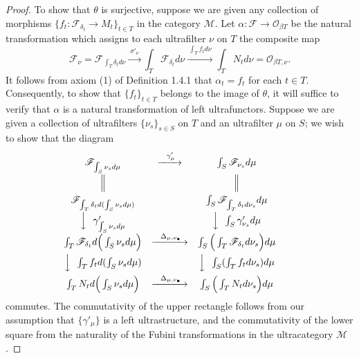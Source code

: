 \documentclass[11pt]{article}
\theoremstyle{plain}
\theoremstyle{definition}
\begin{document}
\begin{proof}
To show that $\theta$ is surjective, suppose we are given any collection of morphisms $\{f_t : \mathscr{F}_{\delta_t} \to M_t\}_{t \in T}$ in the category $\mathcal{M}$. Let $\alpha : \mathscr{F} \to \mathcal{O}_{\beta T}$ be the natural transformation which assigns to each ultrafilter $\nu$ on $T$ the composite map
\[
\mathscr{F}_\nu = \mathscr{F}_{\int_T \delta_t d\nu} \xrightarrow{\ \sigma'_\nu\ } \int_T \mathscr{F}_{\delta_t} d\nu \xrightarrow{\ \int_T f_t d\nu\ } \int_T N_t d\nu = \mathcal{O}_{\beta T, \nu}.
\]
It follows from axiom (1) of Definition 1.4.1 that $\alpha_t = f_t$ for each $t \in T$. Consequently, to show that $\{f_t\}_{t \in T}$ belongs to the image of $\theta$, it will suffice to verify that $\alpha$ is a natural transformation of left ultrafunctors. Suppose we are given a collection of ultrafilters $\{\nu_s\}_{s \in S}$ on $T$ and an ultrafilter $\mu$ on $S$; we wish to show that the diagram
\[
\begin{array}{ccccc}
\mathscr{F}_{\int_S \nu_s d\mu} & \xrightarrow{\ \ \gamma'_\mu\ } & \int_S \mathscr{F}_{\nu_s} d\mu & & \\[6pt]
\Big\Vert & & \Big\Vert & & \\[6pt]
\mathscr{F}_{\int_T \delta_t d(\int_S \nu_s d\mu)} & & \int_S \mathscr{F}_{\int_T \delta_t d\nu_s} d\mu & & \\[6pt]
\Big\downarrow{\ \ \gamma'_{\int_S \nu_s d\mu}} & & \Big\downarrow{\ \ \int_S \gamma'_{\nu_s} d\mu} & & \\[6pt]
\int_T \mathscr{F}_{\delta_t} d\Big(\int_S \nu_s d\mu\Big) & \xrightarrow{\ \ \Delta_{\mu, \nu_\bullet}\ } & \int_S \Big(\int_T \mathscr{F}_{\delta_t} d\nu_s\Big) d\mu & & \\[6pt]
\Big\downarrow{\ \ \int_T f_t d(\int_S \nu_s d\mu)} & & \Big\downarrow{\ \ \int_S (\int_T f_t d\nu_s) d\mu} & & \\[6pt]
\int_T N_t d\Big(\int_S \nu_s d\mu\Big) & \xrightarrow{\ \ \Delta_{\mu, \nu_\bullet}\ } & \int_S \Big(\int_T N_t d\nu_s\Big) d\mu & & \\
\end{array}
\]
commutes. The commutativity of the upper rectangle follows from our assumption that $\{\gamma'_\mu\}$ is a left ultrastructure, and the commutativity of the lower square from the naturality of the Fubini transformations in the ultracategory $\mathcal{M}$.
\end{proof}
\end{document}
